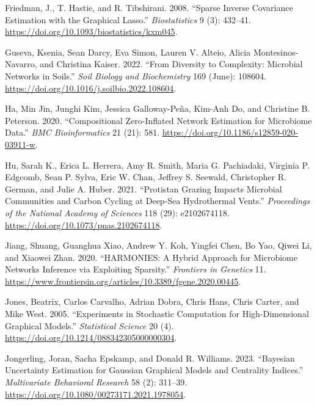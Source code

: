 \documentclass[
  a4paper,
]{article}
\newlength{\cslhangindent}
\newlength{\cslentryspacingunit} %
\newenvironment{CSLReferences}[2] %
 {%
  \setlength{\parindent}{0pt}
  \ifodd #1
  \let\oldpar\par
  \def\par{\hangindent=\cslhangindent\oldpar}
  \fi
  \setlength{\parskip}{#2\cslentryspacingunit}
 }%
 {}
\begin{document}
\begin{CSLReferences}{1}{0}
\leavevmode{}%
Friedman, J., T. Hastie, and R. Tibshirani. 2008. {``Sparse Inverse
Covariance Estimation with the Graphical Lasso.''} \emph{Biostatistics}
9 (3): 432--41. \url{https://doi.org/10.1093/biostatistics/kxm045}.

\leavevmode{}%
Guseva, Ksenia, Sean Darcy, Eva Simon, Lauren V. Alteio, Alicia
Montesinos-Navarro, and Christina Kaiser. 2022. {``From Diversity to
Complexity: Microbial Networks in Soils.''} \emph{Soil Biology and
Biochemistry} 169 (June): 108604.
\url{https://doi.org/10.1016/j.soilbio.2022.108604}.

\leavevmode{}%
Ha, Min Jin, Junghi Kim, Jessica Galloway-Peña, Kim-Anh Do, and
Christine B. Peterson. 2020. {``Compositional Zero-Inflated Network
Estimation for Microbiome Data.''} \emph{BMC Bioinformatics} 21 (21):
581. \url{https://doi.org/10.1186/s12859-020-03911-w}.

\leavevmode{}%
Hu, Sarah K., Erica L. Herrera, Amy R. Smith, Maria G. Pachiadaki,
Virginia P. Edgcomb, Sean P. Sylva, Eric W. Chan, Jeffrey S. Seewald,
Christopher R. German, and Julie A. Huber. 2021. {``Protistan Grazing
Impacts Microbial Communities and Carbon Cycling at Deep-Sea
Hydrothermal Vents.''} \emph{Proceedings of the National Academy of
Sciences} 118 (29): e2102674118.
\url{https://doi.org/10.1073/pnas.2102674118}.

\leavevmode{}%
Jiang, Shuang, Guanghua Xiao, Andrew Y. Koh, Yingfei Chen, Bo Yao, Qiwei
Li, and Xiaowei Zhan. 2020. {``HARMONIES: A Hybrid Approach for
Microbiome Networks Inference via Exploiting Sparsity.''}
\emph{Frontiers in Genetics} 11.
\url{https://www.frontiersin.org/articles/10.3389/fgene.2020.00445}.

\leavevmode{}%
Jones, Beatrix, Carlos Carvalho, Adrian Dobra, Chris Hans, Chris Carter,
and Mike West. 2005. {``Experiments in Stochastic Computation for
High-Dimensional Graphical Models.''} \emph{Statistical Science} 20 (4).
\url{https://doi.org/10.1214/088342305000000304}.

\leavevmode{}%
Jongerling, Joran, Sacha Epskamp, and Donald R. Williams. 2023.
{``Bayesian Uncertainty Estimation for Gaussian Graphical Models and
Centrality Indices.''} \emph{Multivariate Behavioral Research} 58 (2):
311--39. \url{https://doi.org/10.1080/00273171.2021.1978054}.


\end{CSLReferences}
\end{document}
